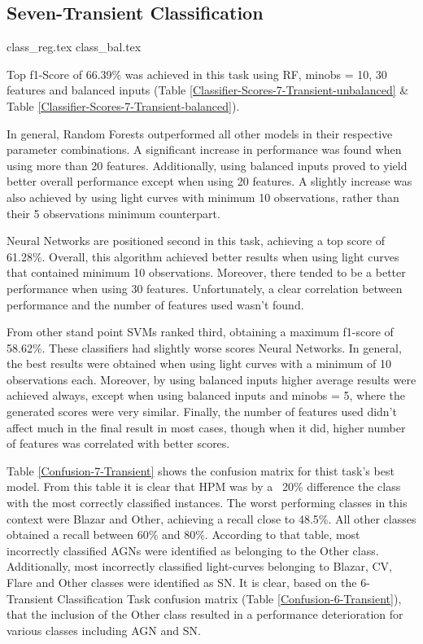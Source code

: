 
\subsection{Seven-Transient Classification}

{class_reg.tex}
{class_bal.tex}

Top f1-Score of 66.39\% was achieved in this task using RF, min\textunderscore obs = 10, 30 features and balanced inputs (Table \ref{Classifier-Scores-7-Transient-unbalanced} \& Table \ref{Classifier-Scores-7-Transient-balanced}).

In general, Random Forests outperformed all other models in their respective parameter combinations. A significant increase in performance was found when using more than 20 features. Additionally, using balanced inputs proved to yield better overall performance except when using 20 features. A slightly increase was also achieved by using light curves with minimum 10 observations, rather than their 5 observations minimum counterpart.

Neural Networks are positioned second in this task, achieving a top score of 61.28\%. Overall, this algorithm achieved better results when using light curves that contained minimum 10 observations. Moreover, there tended to be a better performance when using 30 features. Unfortunately, a clear correlation between performance and the number of features used wasn't found.

From other stand point SVMs ranked third, obtaining a maximum f1-score of 58.62\%. These classifiers had slightly worse scores Neural Networks. In general, the best results were obtained when using light curves with a minimum of 10 observations each. Moreover, by using balanced inputs higher average results were achieved always, except when using balanced inputs and min\textunderscore obs = 5, where the generated scores were very similar. Finally, the number of features used didn't affect much in the final result in most cases, though when it did, higher number of features was correlated with better scores.

Table \ref{Confusion-7-Transient} shows the confusion matrix for thist task's best model. From this table it is clear that HPM was by a ~20\% difference the class with the most correctly classified instances. The worst performing classes in this context were Blazar and Other, achieving a recall close to 48.5\%. All other classes obtained a recall between 60\% and 80\%. According to that table, most incorrectly classified AGNs were identified as belonging to the Other class. Additionally, most incorrectly classified light-curves belonging to Blazar, CV, Flare and Other classes were identified as SN. It is clear, based on the 6-Transient Classification Task confusion matrix (Table \ref{Confusion-6-Transient}), that the inclusion of the Other class resulted in a performance deterioration for various classes including AGN and SN.

